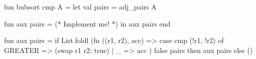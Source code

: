 \begin{parts}
    \begin{codeblock}
      fun bubsort cmp A =
        let
          val pairs = adj_pairs A

          fun aux pairs = (* Implement me! *)
        in
          aux pairs
        end
    \end{codeblock}

    \newpage

    \begin{solutionorbox}[45em]
      \begin{codeblock}
        fun aux pairs =
          if
            List.foldl (fn ((r1, r2), acc) =>
              case cmp (!r1, !r2) of
                GREATER => (swap r1 r2; true)
              | _ => acc
            ) false pairs
          then
            aux pairs
          else
            ()
      \end{codeblock}

    \end{solutionorbox}
\end{parts}

\newpage
